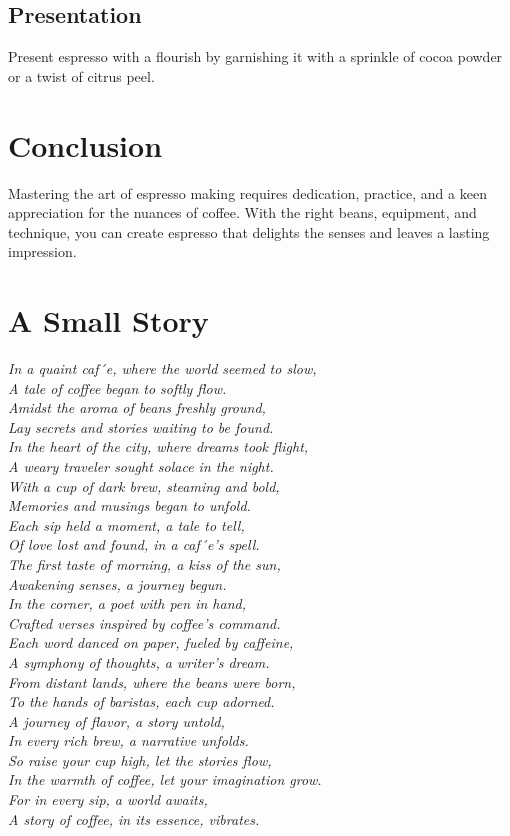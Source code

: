 \documentclass[12pt,a4paper]{article}
\begin{document}
\subsection{Presentation}
Present espresso with a flourish by garnishing it with a sprinkle of cocoa powder or a twist of citrus peel.

\section{Conclusion}
Mastering the art of espresso making requires dedication, practice, and a keen appreciation for the nuances of coffee. With the right beans, equipment, and technique, you can create espresso that delights the senses and leaves a lasting impression.

\section{A Small Story}
\begin{flushright}
\textit{In a quaint caf´e, where the world seemed to slow,\\
A tale of coffee began to softly flow.\\
Amidst the aroma of beans freshly ground,\\
Lay secrets and stories waiting to be found.\\
In the heart of the city, where dreams took flight,\\
A weary traveler sought solace in the night.\\
With a cup of dark brew, steaming and bold,\\
Memories and musings began to unfold.\\
Each sip held a moment, a tale to tell,\\
Of love lost and found, in a caf´e’s spell.\\
The first taste of morning, a kiss of the sun,\\
Awakening senses, a journey begun.\\
In the corner, a poet with pen in hand,\\
Crafted verses inspired by coffee’s command.\\
Each word danced on paper, fueled by caffeine,\\
A symphony of thoughts, a writer’s dream.\\
From distant lands, where the beans were born,\\
To the hands of baristas, each cup adorned.\\
A journey of flavor, a story untold,\\
In every rich brew, a narrative unfolds.\\
So raise your cup high, let the stories flow,\\
In the warmth of coffee, let your imagination grow.\\
For in every sip, a world awaits,\\
A story of coffee, in its essence, vibrates.}
\end{flushright}
\end{document}
